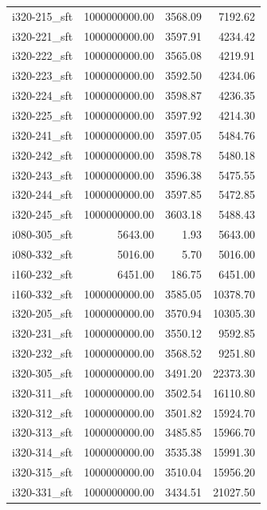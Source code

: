 \begin{tabular}{lrrr}
i320-215\_sft & 1000000000.00 &           3568.09 &     7192.62 \\
i320-221\_sft & 1000000000.00 &           3597.91 &     4234.42 \\
i320-222\_sft & 1000000000.00 &           3565.08 &     4219.91 \\
i320-223\_sft & 1000000000.00 &           3592.50 &     4234.06 \\
i320-224\_sft & 1000000000.00 &           3598.87 &     4236.35 \\
i320-225\_sft & 1000000000.00 &           3597.92 &     4214.30 \\
i320-241\_sft & 1000000000.00 &           3597.05 &     5484.76 \\
i320-242\_sft & 1000000000.00 &           3598.78 &     5480.18 \\
i320-243\_sft & 1000000000.00 &           3596.38 &     5475.55 \\
i320-244\_sft & 1000000000.00 &           3597.85 &     5472.85 \\
i320-245\_sft & 1000000000.00 &           3603.18 &     5488.43 \\
i080-305\_sft &       5643.00 &              1.93 &     5643.00 \\
i080-332\_sft &       5016.00 &              5.70 &     5016.00 \\
i160-232\_sft &       6451.00 &            186.75 &     6451.00 \\
i160-332\_sft & 1000000000.00 &           3585.05 &    10378.70 \\
i320-205\_sft & 1000000000.00 &           3570.94 &    10305.30 \\
i320-231\_sft & 1000000000.00 &           3550.12 &     9592.85 \\
i320-232\_sft & 1000000000.00 &           3568.52 &     9251.80 \\
i320-305\_sft & 1000000000.00 &           3491.20 &    22373.30 \\
i320-311\_sft & 1000000000.00 &           3502.54 &    16110.80 \\
i320-312\_sft & 1000000000.00 &           3501.82 &    15924.70 \\
i320-313\_sft & 1000000000.00 &           3485.85 &    15966.70 \\
i320-314\_sft & 1000000000.00 &           3535.38 &    15991.30 \\
i320-315\_sft & 1000000000.00 &           3510.04 &    15956.20 \\
i320-331\_sft & 1000000000.00 &           3434.51 &    21027.50 \\

\end{tabular}
